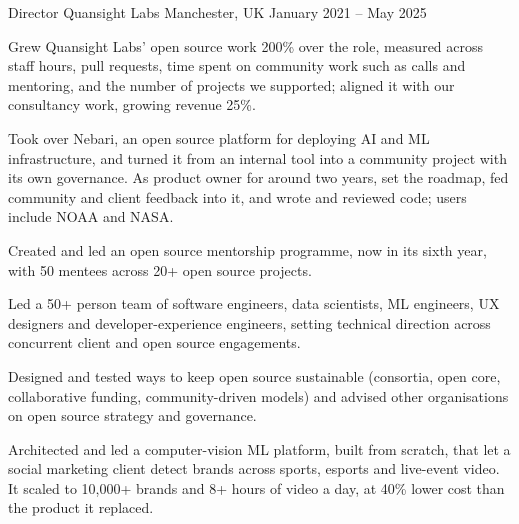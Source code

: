 \begin{cventries}
\cventry
{Director}
{Quansight Labs}
{Manchester, UK}
{January 2021 -- May 2025}
{
\begin{cvitems}
  \item {Grew Quansight Labs' open source work 200\% over the role, measured across staff hours, pull requests, time spent on community work such as calls and mentoring, and the number of projects we supported; aligned it with our consultancy work, growing revenue 25\%.}
  \item {Took over Nebari, an open source platform for deploying AI and ML infrastructure, and turned it from an internal tool into a community project with its own governance. As product owner for around two years, set the roadmap, fed community and client feedback into it, and wrote and reviewed code; users include NOAA and NASA.}
  \item {Created and led an open source mentorship programme, now in its sixth year, with 50 mentees across 20+ open source projects.}
  \item {Led a 50+ person team of software engineers, data scientists, ML engineers, UX designers and developer-experience engineers, setting technical direction across concurrent client and open source engagements.}
  \item {Designed and tested ways to keep open source sustainable (consortia, open core, collaborative funding, community-driven models) and advised other organisations on open source strategy and governance.}
  \item {Architected and led a computer-vision ML platform, built from scratch, that let a social marketing client detect brands across sports, esports and live-event video. It scaled to 10,000+ brands and 8+ hours of video a day, at 40\% lower cost than the product it replaced.}
\end{cvitems}
}


\end{cventries}
